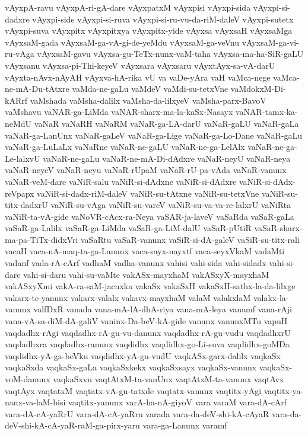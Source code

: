 {vAyxpA-ravu
vAyxpA-ri-gA-dare
vAyxpatxM
vAyxpisi
vAyxpi-sida
vAyxpi-si-dadxre
vAyxpi-side
vAyxpi-si-ruva
vAyxpi-si-ru-vu-da-riM-daleV
vAyxpi-sutetx
vAyxpi-suva
vAyxpitx
vAyxpitxya
vAyxpitx-yide
vAyxsa
vAyxsaH
vAyxsaMga
vAyxsaM-gada
vAyxsaM-ga-vA-gi-de-yeMdu
vAyxsaM-ga-veVnu
vAyxsaM-ga-vi-ru-vAga
vAyxsaM-gavu
vAyxsa-gu-TeTx-nunx-vaM-taha
vAyxsa-ma-ha-SiR-gaLU
vAyxsanu
vAyxsa-pi-Thi-keyeV
vAyxsara
vAyxsaru
vAyxtAyx-sa-vA-darU
vAyxta-nAvx-nAyAH
vAyxva-hA-rika
vU
va
vaDe-yAra
vaH
vaMca-nege
vaMca-ne-mA-Du-tAtxre
vaMda-ne-gaLu
vaMdeV
vaMdi-su-tetxVne
vaMdokxM-Di-kARrf
vaMshada
vaMsha-dalilx
vaMsha-da-lilxyeV
vaMsha-parx-BavoV
vaMshavu
vaNAR-ga-LiMda
vaNAR-sharx-ma-la-kaSx-Nasayx
vaNAR-tamx-ka-neMdU
vaNaR
vaNaRH
vaNaRM
vaNaR-ga-LA-darU
vaNaR-gaLU
vaNaR-gaLa
vaNaR-ga-LanUnx
vaNaR-gaLeV
vaNaR-ga-Lige
vaNaR-ga-Lo-Dane
vaNaR-gaLu
vaNaR-ga-LuLaLx
vaNaRne
vaNaR-ne-gaLU
vaNaR-ne-ga-LelAlx
vaNaR-ne-ga-Le-lalxvU
vaNaR-ne-gaLu
vaNaR-ne-mA-Di-dAdxre
vaNaR-neyU
vaNaR-neya
vaNaR-neyeV
vaNaR-neyu
vaNaR-rUpaM
vaNaR-rU-pa-vAda
vaNaR-vanunx
vaNaR-veM-dare
vaNiR-salu
vaNiR-si-dAdxne
vaNiR-si-dAdxre
vaNiR-si-dAdx-reVpapx
vaNiR-si-dadx-riM-daleV
vaNiR-su-tAtxne
vaNiR-su-tetxVne
vaNiR-su-titx-dadxrU
vaNiR-su-vAga
vaNiR-su-vareV
vaNiR-su-va-va-re-lalxrU
vaNiRta
vaNiR-ta-vA-gide
vaNoVR-cAcx-ra-Neya
vaSAR-ja-laveV
vaSaRda
vaSaR-gaLa
vaSaR-ga-Lalilx
vaSaR-ga-LiMda
vaSaR-ga-LiM-dalU
vaSaR-pUtiR
vaSaR-sharx-ma-pa-TiTx-didxVri
vaSaRtu
vaSaR-vanunx
vaSiR-si-dA-galeV
vaSiR-su-titx-rali
vacaH
vaca-nA-maq-ta-ga-Lanunx
vaca-sayx-nayxtf
vaca-seyxVkaM
vadaMti
vadanf
vada-rA-cArf
vadhaM
vadha-vanunx
vahisi
vahi-sida
vahi-sidadx
vahi-si-dare
vahi-si-daru
vahi-su-vaMte
vakASx-mayxhaM
vakASxyX-mayxhaM
vakASxyXmi
vakA-ra-saM-jacnxka
vakaSx
vakaSxH
vakaSxH-sathx-la-da-lilxge
vakarx-te-yanunx
vakarx-valalx
vakavx-mayxhaM
valaM
valakxlaM
valakx-la-vanunx
valfDxR
vanada
vana-mA-lA-dhA-riya
vana-mA-leya
vanamf
vana-rAji
vana-vA-sa-diM-dA-galiV
vaninx-Da-beV-kA-gide
vanunx
vanunxMTu
vapuH
vaqdadhx-rAgi
vaqdadhx-rA-gu-vu-danunx
vaqdadhx-rA-gu-vudu
vaqdadhxrU
vaqdadhxra
vaqdadhx-ranunx
vaqdidhx
vaqdidhx-go-Li-suva
vaqdidhx-goMDa
vaqdidhx-yA-ga-beVku
vaqdidhx-yA-gu-vudU
vaqkASx-garx-dalilx
vaqkaSx
vaqkaSxda
vaqkaSx-gaLa
vaqkaSxkekx
vaqkaSxsayx
vaqkaSx-vanunx
vaqkaSx-voM-danunx
vaqkaSxvu
vaqtAtxM-ta-vanUnx
vaqtAtxM-ta-vanunx
vaqtAvx
vaqtAyx
vaqtatxM
vaqtatx-vA-gu-tatxde
vaqtatx-vanunx
vaqtitx-yAgi
vaqtitx-ya-nanx-va-laM-bisi
vaqtitx-yanunx
varA-ha-nA-giyoV
vara
varaM
vara-dA-cArf
vara-dA-cA-yaRrU
vara-dA-cA-yaRru
varada
vara-da-deV-shi-kA-cAyaR
vara-da-deV-shi-kA-cA-yaR-raM-ga-pirx-yaru
vara-ga-Lanunx
varamf
}
